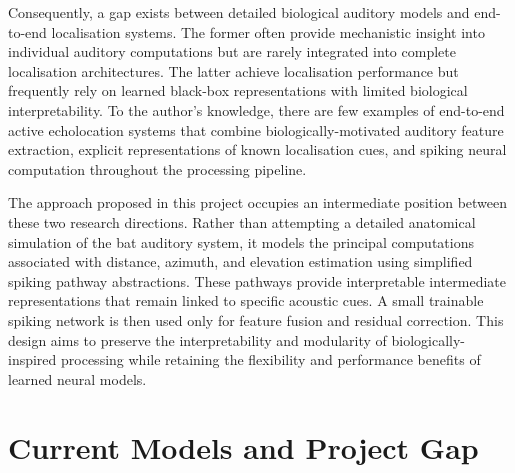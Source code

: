 Consequently, a gap exists between detailed biological auditory models and end-to-end localisation systems. The former often provide mechanistic insight into individual auditory computations but are rarely integrated into complete localisation architectures. The latter achieve localisation performance but frequently rely on learned black-box representations with limited biological interpretability. To the author's knowledge, there are few examples of end-to-end active echolocation systems that combine biologically-motivated auditory feature extraction, explicit representations of known localisation cues, and spiking neural computation throughout the processing pipeline.

The approach proposed in this project occupies an intermediate position between these two research directions. Rather than attempting a detailed anatomical simulation of the bat auditory system, it models the principal computations associated with distance, azimuth, and elevation estimation using simplified spiking pathway abstractions. These pathways provide interpretable intermediate representations that remain linked to specific acoustic cues. A small trainable spiking network is then used only for feature fusion and residual correction. This design aims to preserve the interpretability and modularity of biologically-inspired processing while retaining the flexibility and performance benefits of learned neural models.



\section{Current Models and Project Gap}

